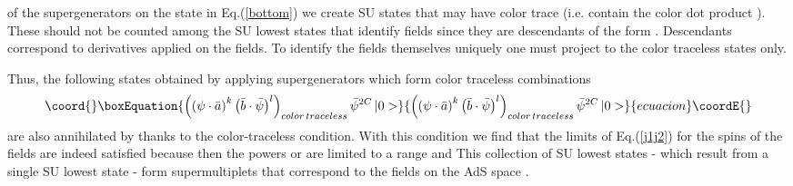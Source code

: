 \documentclass[a4paper,aps,preprint,nofootinbib]{revtex4}
\begin{document}
of the supergenerators \coordHE{} on the state in Eq.(\ref{bottom}) we create SU\coordHE{} states that may have color trace (i.e. contain the color
dot product \coordHE{}). These should not be counted among the SU\coordHE{} lowest states that identify fields since they are
descendants of the form \coordHE{}. Descendants correspond to derivatives
applied on the fields. To identify the fields themselves uniquely one must
project to the color traceless states only.

Thus, the following states obtained by applying supergenerators which form
color traceless combinations
\begin{equation}\coord{}\boxEquation{
\left( \left( \psi\cdot\bar{a}\right) ^{k}\left( \bar{b}\cdot\bar{\psi }
\right) ^{l}\right) _{color\,traceless}\bar{\psi}^{2C}\,|0>  \label{lowest}
}{
\left( \left( \psi\cdot\bar{a}\right) ^{k}\left( \bar{b}\cdot\bar{\psi }
\right) ^{l}\right) _{color\,traceless}\bar{\psi}^{2C}\,|0>  }{ecuacion}\coordE{}\end{equation}
are also annihilated by \coordHE{} thanks to the color-traceless condition.
With this condition we find that the limits of Eq.(\ref{j1j2}) for the spins
of the fields are indeed satisfied because then the powers \coordHE{} or \coordHE{} are
limited to a range \coordHE{}  \coordHE{} and \coordHE{} This collection of SU\coordHE{} lowest states - which
result from a single SU\coordHE{} lowest state - form
supermultiplets that correspond to the fields on the AdS space \coordHE{}.
\end{document}
